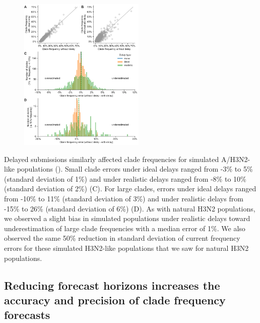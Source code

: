 \documentclass[9pt,lineno]{elife}
\begin{document}
\begin{figure}[htb!]
{\includegraphics[width=6cm]{figures/simulated_current_frequency_errors_by_delay}}\label{figsupp:simulated_current_clade_frequency_errors}
%
\label{figdata:h3n2_tip_attributes}
\label{figsrccode:current_clade_frequency_errors}
\end{figure}

Delayed submissions similarly affected clade frequencies for simulated A/H3N2-like populations ().
Small clade errors under ideal delays ranged from -3\% to 5\% (standard deviation of 1\%) and under realistic delays ranged from -8\% to 10\% (standard deviation of 2\%) (C).
For large clades, errors under ideal delays ranged from -10\% to 11\% (standard deviation of 3\%) and under realistic delays from -15\% to 26\% (standard deviation of 6\%) (D).
As with natural H3N2 populations, we observed a slight bias in simulated populations under realistic delays toward underestimation of large clade frequencies with a median error of 1\%.
We also observed the same 50\% reduction in standard deviation of current frequency errors for these simulated H3N2-like populations that we saw for natural H3N2 populations.

\subsection{Reducing forecast horizons increases the accuracy and precision of clade frequency forecasts}
\end{document}
